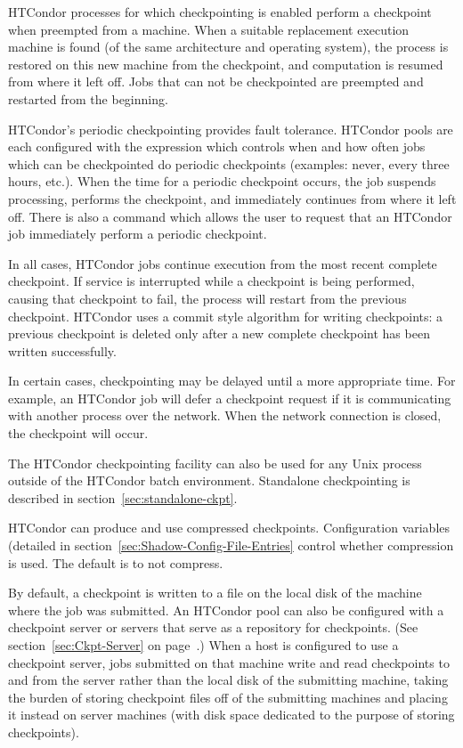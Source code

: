 HTCondor processes for which checkpointing is enabled perform a
checkpoint when preempted from a machine.  When a suitable replacement
execution machine is found (of the same architecture and operating
system), the process is restored on this new machine from the
checkpoint, and computation is resumed from where it left off.  Jobs
that can not be checkpointed are preempted and restarted from the
beginning.

HTCondor's periodic checkpointing provides fault tolerance.  HTCondor
pools are each configured with the 
expression which controls when and how often jobs which can be
checkpointed do periodic checkpoints (examples: never, every three
hours, etc.).  When the time for a periodic checkpoint occurs, the job
suspends processing, performs the checkpoint, and immediately
continues from where it left off.  There is also a  command
which allows the user to request that an HTCondor job immediately perform
a periodic checkpoint.

In all cases, HTCondor jobs continue execution from the most recent
complete checkpoint.  If service is interrupted while a checkpoint is
being performed, causing that checkpoint to fail, the process will
restart from the previous checkpoint.  HTCondor uses a commit style
algorithm for writing checkpoints: a previous checkpoint is deleted
only after a new complete checkpoint has been written successfully.

In certain cases, checkpointing may be delayed until a more appropriate
time.  For example, an HTCondor job will defer a checkpoint request if
it is communicating with another process over the network.  When the
network connection is closed, the checkpoint will occur.

The HTCondor checkpointing facility can also be used for any Unix process
outside of the HTCondor batch environment. Standalone checkpointing
is described in section~\ref{sec:standalone-ckpt}.

HTCondor can produce and use compressed checkpoints.
Configuration variables (detailed in 
section~\ref{sec:Shadow-Config-File-Entries}
control whether compression is used.
The default is to not compress.

By default, a checkpoint is written to a file on the local disk of the
machine where the job was submitted.  An HTCondor pool can also be
configured with a checkpoint server or servers that
serve as a repository for checkpoints.  (See
section~\ref{sec:Ckpt-Server} on page~\pageref{sec:Ckpt-Server}.)
When a host is configured to use a checkpoint server, jobs submitted
on that machine write and read checkpoints to and from the server
rather than the local disk of the submitting machine, taking the
burden of storing checkpoint files off of the submitting machines and
placing it instead on server machines (with disk space dedicated to
the purpose of storing checkpoints).

